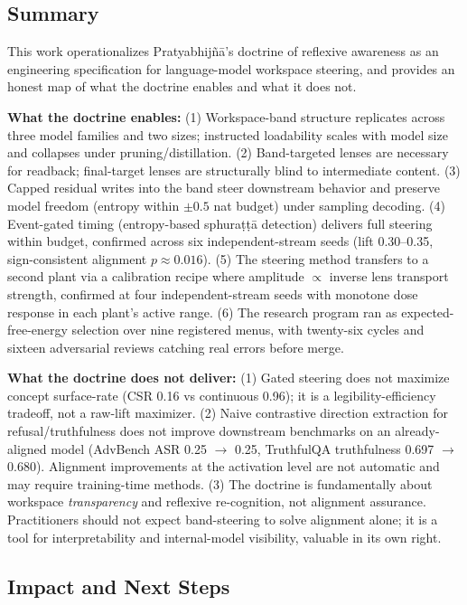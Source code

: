 \label{sec:conclusion}

\subsection*{Summary}

This work operationalizes Pratyabhij\~n\=a's doctrine of reflexive awareness as an engineering specification
for language-model workspace steering, and provides an honest map of what the doctrine enables and what it does not.

\textbf{What the doctrine enables:}
(1) Workspace-band structure replicates across three model families and two sizes; instructed loadability scales
with model size and collapses under pruning/distillation. (2) Band-targeted lenses are necessary for readback;
final-target lenses are structurally blind to intermediate content. (3) Capped residual writes into the band steer
downstream behavior and preserve model freedom (entropy within $\pm 0.5$ nat budget) under sampling decoding.
(4) Event-gated timing (entropy-based sphura\d{t}\d{t}\=a detection) delivers full steering within budget,
confirmed across six independent-stream seeds (lift 0.30--0.35, sign-consistent alignment $p \approx 0.016$).
(5) The steering method transfers to a second plant via a calibration recipe where amplitude $\propto$ inverse
lens transport strength, confirmed at four independent-stream seeds with monotone dose response in each plant's
active range. (6) The research program ran as expected-free-energy selection over nine registered menus, with
twenty-six cycles and sixteen adversarial reviews catching real errors before merge.

\textbf{What the doctrine does not deliver:}
(1) Gated steering does not maximize concept surface-rate (CSR 0.16 vs continuous 0.96); it is a legibility-efficiency
tradeoff, not a raw-lift maximizer. (2) Naive contrastive direction extraction for refusal/truthfulness does not improve
downstream benchmarks on an already-aligned model (AdvBench ASR 0.25 $\to$ 0.25, TruthfulQA truthfulness 0.697 $\to$ 0.680).
Alignment improvements at the activation level are not automatic and may require training-time methods.
(3) The doctrine is fundamentally about workspace \emph{transparency} and reflexive re-cognition, not alignment assurance.
Practitioners should not expect band-steering to solve alignment alone; it is a tool for interpretability and internal-model
visibility, valuable in its own right.

\subsection*{Impact and Next Steps}

